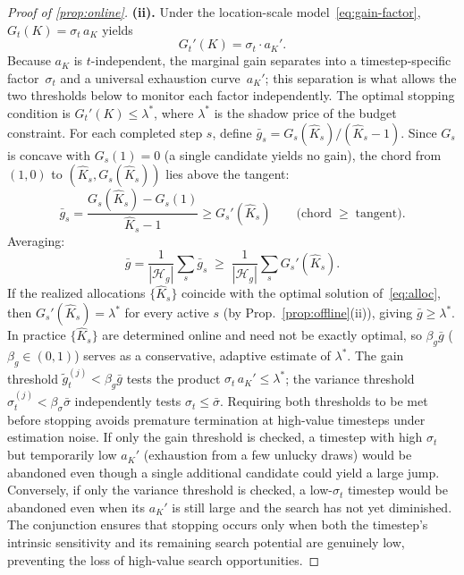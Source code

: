 \begin{proof}[Proof of \cref{prop:online}]
\textbf{(ii).}\;
Under the location-scale model~\eqref{eq:gain-factor},
$G_t(K)=\sigma_t\,a_K$ yields
\[
  G_t'(K)=\sigma_t\cdot a_K'.
\]
Because $a_K$ is $t$-independent, the marginal gain separates into
a timestep-specific factor~$\sigma_t$ and a universal exhaustion
curve~$a_K'$; this separation is what allows the two thresholds below
to monitor each factor independently.
The optimal stopping condition is $G_t'(K)\le\lambda^*$, where
$\lambda^*$ is the shadow price of the budget constraint.
For each completed step $s$, define
$\bar{g}_s=G_s(\hat{K}_s)/(\hat{K}_s - 1)$.
Since $G_s$ is concave with $G_s(1)=0$
(a single candidate yields no gain), the chord from
$(1,0)$ to $(\hat{K}_s, G_s(\hat{K}_s))$ lies above the tangent:
\[
  \bar{g}_s
  =\frac{G_s(\hat{K}_s)-G_s(1)}{\hat{K}_s-1}
  \ge G_s'(\hat{K}_s)
  \qquad\text{(chord}\;\ge\;\text{tangent)}.
\]
Averaging:
\[
  \bar{g}
  =\frac{1}{|\mathcal{H}_g|}\sum_s\bar{g}_s
  \;\ge\;
  \frac{1}{|\mathcal{H}_g|}\sum_s G_s'(\hat{K}_s).
\]
If the realized allocations $\{\hat{K}_s\}$ coincide with the optimal
solution of~\eqref{eq:alloc}, then
$G_s'(\hat{K}_s)=\lambda^*$ for every active $s$ (by Prop.~\ref{prop:offline}(ii)),
giving $\bar{g}\ge\lambda^*$.
In practice $\{\hat{K}_s\}$ are determined online and need not be
exactly optimal, so $\beta_g\bar{g}$ ($\beta_g\in(0,1)$) serves as a
conservative, adaptive estimate of $\lambda^*$.
The gain threshold $\widetilde{g}_t^{(j)}<\beta_g\bar{g}$ tests the
product $\sigma_t\,a_K'\le\lambda^*$; the variance threshold
$\hat{\sigma}_t^{(j)}<\beta_\sigma\bar{\sigma}$ independently tests
$\sigma_t\le\bar{\sigma}$.
Requiring both thresholds to be met before stopping avoids
premature termination at high-value timesteps under estimation noise.
If only the gain threshold is checked, a timestep with high
$\sigma_t$ but temporarily low $a_K'$ (exhaustion from a few
unlucky draws) would be abandoned even though a single additional
candidate could yield a large jump.
Conversely, if only the variance threshold is checked, a low-$\sigma_t$
timestep would be abandoned even when its $a_K'$ is still large and
the search has not yet diminished.
The conjunction ensures that stopping occurs only when both the
timestep's intrinsic sensitivity and its remaining search potential
are genuinely low, preventing the loss of high-value search
opportunities.
\end{proof}
